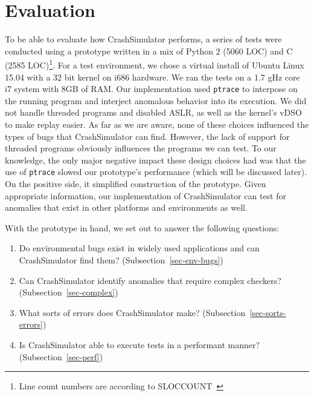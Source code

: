 \section{Evaluation}
\label{SEC:evaluation}


To be able to evaluate how CrashSimulator performs, a series of tests were
conducted using a prototype written in a mix of Python 2 (5060 LOC) and C
(2585 LOC)\footnote{ Line count numbers are according to
SLOCCOUNT~\cite{SLOCCOUNT}}.  For a test environment, we chose a virtual
install of Ubuntu Linux 15.04 with a 32 bit kernel on i686 hardware.  We
ran the tests on a 1.7 gHz core i7 system with 8GB of RAM. Our
implementation used {\tt ptrace} to interpose on the running program and
interject anomalous behavior into its execution.  We did not handle
threaded programs and disabled ASLR, as well as the kernel's vDSO to make
replay easier.  As far as we are aware, none of these choices influenced
the types of bugs that CrashSimulator can find. However, the lack of
support for threaded programs obviously influences the programs we can
test.  To our knowledge, the only major negative impact these design
choices had was that the use of {\tt ptrace} slowed our prototype's
performance (which will be discussed later).  On the positive side, it
simplified construction of the prototype. Given appropriate information,
our implementation of CrashSimulator can test for anomalies that exist in
other platforms and environments as well.

With the prototype in hand,  we set out to answer the following questions:

\begin{enumerate}

\item{Do environmental bugs exist in widely used applications and can
      CrashSimulator find them? (Subsection~\ref{sec-env-bugs})}

\item{Can CrashSimulator identify anomalies that require complex checkers?
      (Subsection~\ref{sec-complex})}

\item{What sorts of errors does CrashSimulator make?
      (Subsection~\ref{sec-sorts-errors})} \item{Is CrashSimulator able to
      execute tests in a performant manner? (Subsection~\ref{sec-perf})}

\end{enumerate}


